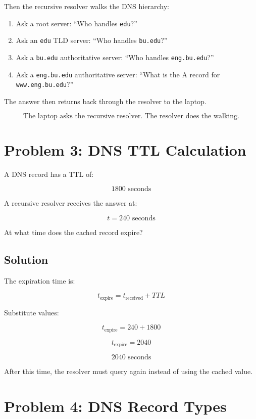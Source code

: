 \documentclass[12pt]{article}
\begin{document}
Then the recursive resolver walks the DNS hierarchy:

\begin{enumerate}
    \item Ask a root server: ``Who handles \texttt{edu}?''
    \item Ask an \texttt{edu} TLD server: ``Who handles \texttt{bu.edu}?''
    \item Ask a \texttt{bu.edu} authoritative server: ``Who handles \texttt{eng.bu.edu}?''
    \item Ask a \texttt{eng.bu.edu} authoritative server: ``What is the A record for \texttt{www.eng.bu.edu}?''
\end{enumerate}

The answer then returns back through the resolver to the laptop.

\[
\boxed{\text{The laptop asks the recursive resolver. The resolver does the walking.}}
\]

\section*{Problem 3: DNS TTL Calculation}

A DNS record has a TTL of:

\[
1800 \text{ seconds}
\]

A recursive resolver receives the answer at:

\[
t = 240 \text{ seconds}
\]

At what time does the cached record expire?

\subsection*{Solution}

The expiration time is:

\[
t_{\text{expire}} = t_{\text{received}} + TTL
\]

Substitute values:

\[
t_{\text{expire}} = 240 + 1800
\]

\[
t_{\text{expire}} = 2040
\]

\[
\boxed{2040 \text{ seconds}}
\]

After this time, the resolver must query again instead of using the cached value.

\section*{Problem 4: DNS Record Types}
\end{document}
